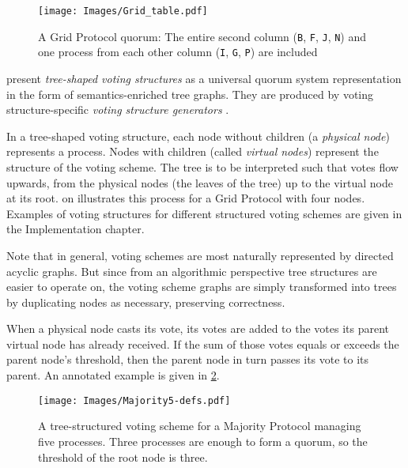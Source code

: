\documentclass[12pt,chapterprefix=true,toc=bibliography,numbers=noendperiod,
               footnotes=multiple,twoside]{scrreprt}
\begin{document}
\begin{figure}[h]
    \centering
    \texttt{[image: Images/Grid\_table.pdf]}
    \caption[Grid protocol quorum table]{A Grid Protocol quorum: The entire second column (\texttt{B}, \texttt{F}, \texttt{J}, \texttt{N}) and one process from each other column (\texttt{I}, \texttt{G}, \texttt{P}) are included}
    \label{fig:grid-quorum}
\end{figure}


\citeauthor{generators} present \emph{tree-shaped voting structures} as a universal quorum system representation in the form of semantics-enriched tree graphs. They are produced by voting structure-specific \emph{voting structure generators} \autocite{generators}.

In a tree-shaped voting structure, each node without children (a \emph{physical node}) represents a process. Nodes with children (called \emph{virtual nodes}) represent the structure of the voting scheme. The tree is to be interpreted such that votes flow upwards, from the physical nodes (the leaves of the tree) up to the virtual node at its root.  on  illustrates this process for a Grid Protocol with four nodes. Examples of voting structures for different structured voting schemes are given in the Implementation chapter.

Note that in general, voting schemes are most naturally represented by directed acyclic graphs. But since from an algorithmic perspective tree structures are easier to operate on, the voting scheme graphs are simply transformed into trees by duplicating nodes as necessary, preserving correctness.

When a physical node casts its vote, its votes are added to the votes its parent virtual node has already received. If the sum of those votes equals or exceeds the parent node's threshold, then the parent node in turn passes its vote to its parent. An annotated example is given in \cref{fig:majority5-defs}.

\begin{figure}[h]
    \centering
    \texttt{[image: Images/Majority5-defs.pdf]}
    \caption[Tree-structured voting scheme for a Majority Protocol]{A tree-structured voting scheme for a Majority Protocol managing five processes. Three processes are enough to form a quorum, so the threshold of the root node is three.}
    \label{fig:majority5-defs}
\end{figure}
\end{document}
